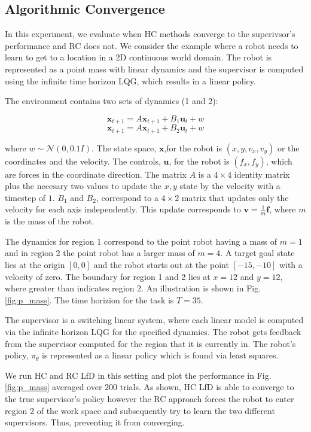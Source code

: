 \documentclass[10pt, conference]{ieeeconf}      %
\newcommand{\bu}{\mathbf{u}}
\newcommand{\bx}{\mathbf{x}}
\begin{document}
\subsection{Algorithmic Convergence }
In this experiment, we evaluate when HC methods converge to the superivsor's performance and RC does not. We consider the example where a robot needs to learn to get to a location in a 2D continuous world domain. The robot is represented as a point mass with linear dynamics and the supervisor is computed using the infinite time horizon LQG, which results in a linear policy. 

The environment contains two sets of dynamics (1 and 2): 

$$\bx_{t+1} = A\bx_{t+1}+B_1\bu_t+w$$
$$\bx_{t+1} = A\bx_{t+1}+B_2\bu_t + w$$

where $w\sim \mathcal{N}(0,0.1 I)$. The state space, $\bx$,for the robot is $(x,y,v_x,v_y)$ or the coordinates and the velocity. The controls, $\bu$, for the robot is $(f_x,f_y)$, which are forces in the coordinate direction. The matrix $A$ is a $4\times4$ identity matrix plus the necesary two values to update the $x,y$ state by the velocity with a timestep of $1$. $B_1$ and $B_2$, correspond to a $4\times 2$ matrix that updates only the velocity for each axis independently. This update corresponds to $\mathbf{v} = \frac{1}{m} \mathbf{f}$, where $m$ is the mass of the robot. 


 The dynamics for region 1 correspond to the point robot having a mass of $m=1$ and in region 2 the point robot has a larger mass of $m=4$. A target goal state lies at the origin $[0,0]$ and the robot starts out at the point $[-15,-10]$ with a velocity of zero. The boundary for region 1 and 2 lies at $x=12$ and $y=12$, where greater than indicates region 2. An illustration is shown in Fig. \ref{fig:p_mass}. The time horizion for the task is $T=35$. 

The supervisor is a switching linear system, where each linear model is computed via the infinite horizon LQG for the specified dynamics. The robot gets feedback from the supervisor computed for the region that it is currently in.  The robot's policy, $\pi_{\theta}$ is represented as a linear policy which is found via least squares. 

We run HC and RC LfD in this setting and plot the performance in Fig. \ref{fig:p_mass} averaged over $200$ trials.  As shown, HC LfD is able to converge to the true supervisor's policy however the RC approach  forces the robot to enter region 2 of the work space and subsequently try to learn the two different supervisors. Thus, preventing it from converging. 
\end{document}
